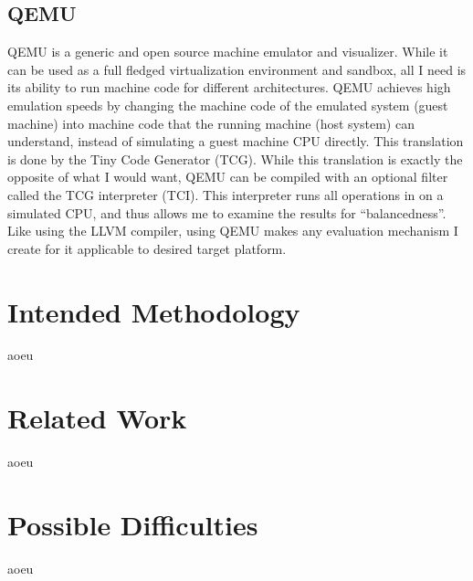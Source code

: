 \documentclass{article}
\newcommand{\qemu}{QEMU}
\newcommand{\llvm}{LLVM}
\begin{document}
\subsection{\qemu{}}
\qemu{} is a generic and open source machine emulator and visualizer.\cite{bellard2005qemu}
While it can be used as a full fledged virtualization environment and sandbox, all I need is its ability to run machine code for different architectures.
\qemu{} achieves high emulation speeds by changing the machine code of the emulated system (guest machine) into machine code that the running machine (host system) can understand, instead of simulating a guest machine CPU directly.
This translation is done by the Tiny Code Generator (TCG).
While this translation is exactly the opposite of what I would want, \qemu{} can be compiled with an optional filter called the TCG interpreter (TCI).
This interpreter runs all operations in on a simulated CPU, and thus allows me to examine the results for ``balancedness''.
Like using the \llvm{} compiler, using \qemu{} makes any evaluation mechanism I create for it applicable to desired target platform.

\section{Intended Methodology}
\label{sec:methodology}
aoeu

\section{Related Work}
\label{sec:related-work}
aoeu

\section{Possible Difficulties}
\label{sec:difficulties}
aoeu




\end{document}
